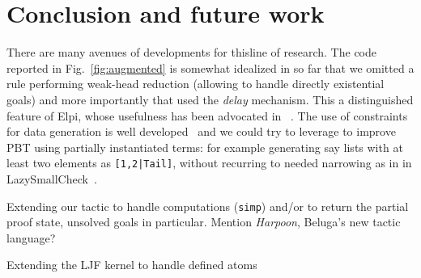 \section{Conclusion and future work}




There are many avenues of developments for thisline of research.
The code reported in Fig.~\ref{fig:augmented} is somewhat idealized in
so far that we omitted a rule performing weak-head reduction (allowing
to handle directly existential goals) and more importantly that used
the \emph{delay} mechanism. This a distinguished feature of Elpi, whose
usefulness has been advocated in ~\cite{DunchevCT16,coen19mscs}.  The
use of constraints for data generation is well
developed~\cite{FioravantiPS15} and we could try to leverage to
improve PBT using partially instantiated terms: for example generating
say lists with at least two elements as \texttt{[1,2|Tail]}, without
recurring to needed narrowing as in in
LazySmallCheck~\cite{smallcheck}.



Extending our tactic to handle computations (\texttt{simp}) and/or to
return the partial proof state, unsolved goals in particular. Mention
\emph{Harpoon}, Beluga's new tactic language?

Extending the LJF kernel to handle defined atoms


